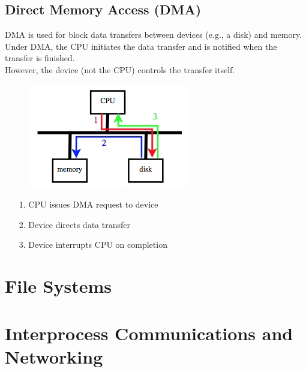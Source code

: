 \documentclass[12pt]{article}
\theoremstyle{plain}
\theoremstyle{definition}
\begin{document}
\subsection{Direct Memory Access (DMA)}
DMA is used for block data transfers between devices (e.g., a disk) and memory. \\

Under DMA, the CPU initiates the data transfer and is notified when the transfer is finished. \\
However, the device (not the CPU) controls the transfer itself.
\begin{figure}[H]
  \centering
  \includegraphics[scale=0.7]{pictures/dma.png}
\end{figure}
\begin{itemize}
  \item[1.] CPU issues DMA request to device
  \item[2.] Device directs data transfer
  \item[3.] Device interrupts CPU on completion
\end{itemize}


\newpage
\section{File Systems}

\newpage
\section{Interprocess Communications and Networking}

\clearpage
\printindex
\end{document}
